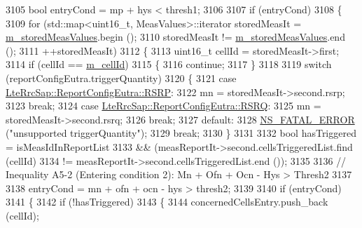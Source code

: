 \begin{DoxyCode}
3105         \textcolor{keywordtype}{bool} entryCond = mp + hys < thresh1;
3106 
3107         \textcolor{keywordflow}{if} (entryCond)
3108           \{
3109             \textcolor{keywordflow}{for} (std::map<uint16\_t, MeasValues>::iterator storedMeasIt = 
      \hyperlink{classns3_1_1LteUeRrc_a93094dcd5c235b2e2a8a299125100a57}{m\_storedMeasValues}.begin ();
3110                  storedMeasIt != \hyperlink{classns3_1_1LteUeRrc_a93094dcd5c235b2e2a8a299125100a57}{m\_storedMeasValues}.end ();
3111                  ++storedMeasIt)
3112               \{
3113                 uint16\_t cellId = storedMeasIt->first;
3114                 \textcolor{keywordflow}{if} (cellId == \hyperlink{classns3_1_1LteUeRrc_aa9d3317734eea9158371d9fccf3a0c48}{m\_cellId})
3115                   \{
3116                     \textcolor{keywordflow}{continue};
3117                   \}
3118 
3119                 \textcolor{keywordflow}{switch} (reportConfigEutra.triggerQuantity)
3120                   \{
3121                   \textcolor{keywordflow}{case} \hyperlink{structns3_1_1LteRrcSap_1_1ReportConfigEutra_a82343ddf526faba0483431ea5882a3efa5b7591e86ab7bcefc7fe1528762114d7}{LteRrcSap::ReportConfigEutra::RSRP}:
3122                     mn = storedMeasIt->second.rsrp;
3123                     \textcolor{keywordflow}{break};
3124                   \textcolor{keywordflow}{case} \hyperlink{structns3_1_1LteRrcSap_1_1ReportConfigEutra_a82343ddf526faba0483431ea5882a3efaa4e09cb3c7154d7ab732115a2647325f}{LteRrcSap::ReportConfigEutra::RSRQ}:
3125                     mn = storedMeasIt->second.rsrq;
3126                     \textcolor{keywordflow}{break};
3127                   \textcolor{keywordflow}{default}:
3128                     \hyperlink{group__fatal_ga5131d5e3f75d7d4cbfd706ac456fdc85}{NS\_FATAL\_ERROR} (\textcolor{stringliteral}{"unsupported triggerQuantity"});
3129                     \textcolor{keywordflow}{break};
3130                   \}
3131 
3132                 \textcolor{keywordtype}{bool} hasTriggered = isMeasIdInReportList
3133                   && (measReportIt->second.cellsTriggeredList.find (cellId)
3134                       != measReportIt->second.cellsTriggeredList.end ());
3135 
3136                 \textcolor{comment}{// Inequality A5-2 (Entering condition 2): Mn + Ofn + Ocn - Hys > Thresh2}
3137 
3138                 entryCond = mn + ofn + ocn - hys > thresh2;
3139 
3140                 \textcolor{keywordflow}{if} (entryCond)
3141                   \{
3142                     \textcolor{keywordflow}{if} (!hasTriggered)
3143                       \{
3144                         concernedCellsEntry.push\_back (cellId);

\end{DoxyCode}
